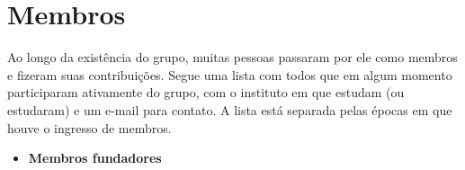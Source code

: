 \documentclass[12pt,onecolumn,a4paper]{article}
\begin{document}
\clearpage
\section{\LARGE Membros}
    Ao longo da existência do grupo, muitas pessoas passaram por ele como membros e fizeram suas
    contribuições. Segue uma lista com todos que em algum momento participaram ativamente do grupo,
    com o instituto em que estudam (ou estudaram) e um e-mail para contato. A lista está separada
    pelas épocas em que houve o ingresso de membros.
    
    \begin{itemize}
        \item{\large \bf Membros fundadores}
        
            \begin{list}{}{ %
                \setlength\itemsep{0.02pt}
                \setlength\parsep{0.0pt}
                \setlength{}
                \setlength\leftmargin{3in}
                \footnotesize
            }
            

\end{list}
\end{itemize}
\end{document}
